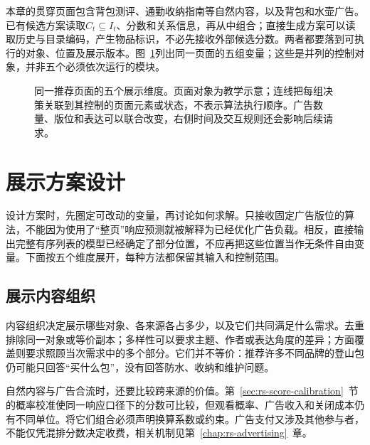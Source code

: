 本章的贯穿页面包含背包测评、通勤收纳指南等自然内容，以及背包和水壶广告。已有候选方案读取$C_t\subseteq I_t$、分数和关系信息，再从中组合；直接生成方案可以读取历史与目录编码，产生物品标识，不必先接收外部候选分数。两者都要落到可执行的对象、位置及展示版本。图~\ref{fig:rs-presentation-dimensions}列出同一页面的五组变量；这些是并列的控制对象，并非五个必须依次运行的模块。

\begin{figure}[htbp]
 \centering
 
 \caption{同一推荐页面的五个展示维度。页面对象为教学示意；连线把每组决策关联到其控制的页面元素或状态，不表示算法执行顺序。广告数量、版位和表达可以联合改变，右侧时间及交互规则还会影响后续请求。}
 \label{fig:rs-presentation-dimensions}
\end{figure}

\section{展示方案设计}
\label{sec:rs-presentation-design}

设计方案时，先圈定可改动的变量，再讨论如何求解。只接收固定广告版位的算法，不能因为使用了“整页”响应预测就被解释为已经优化广告负载。相反，直接输出完整有序列表的模型已经确定了部分位置，不应再把这些位置当作无条件自由变量。下面按五个维度展开，每种方法都保留其输入和控制范围。

\subsection{展示内容组织}
\label{sec:rs-content-organization}

内容组织决定展示哪些对象、各来源各占多少，以及它们共同满足什么需求。去重排除同一对象或等价副本；多样性可以要求主题、作者或表达角度的差异；方面覆盖则要求照顾当次需求中的多个部分。它们并不等价：推荐许多不同品牌的登山包仍可能只回答“买什么包”，没有回答防水、收纳和维护问题。

自然内容与广告合流时，还要比较跨来源的价值。第~\ref{sec:rs-score-calibration}~节的概率校准使同一响应口径下的分数可比较，但观看概率、广告收入和关闭成本仍有不同单位。将它们组合必须声明换算系数或约束。广告支付又涉及其他参与者，不能仅凭混排分数决定收费，相关机制见第~\ref{chap:rs-advertising}~章。

